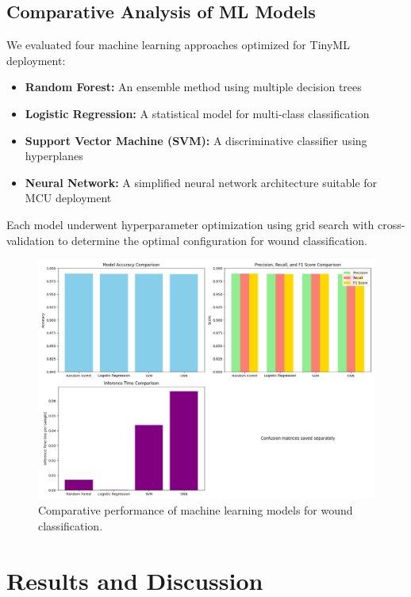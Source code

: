 \documentclass[conference]{IEEEtran}
\begin{document}
\subsection{Comparative Analysis of ML Models}
We evaluated four machine learning approaches optimized for TinyML deployment:

\begin{itemize}
    \item \textbf{Random Forest:} An ensemble method using multiple decision trees
    \item \textbf{Logistic Regression:} A statistical model for multi-class classification
    \item \textbf{Support Vector Machine (SVM):} A discriminative classifier using hyperplanes
    \item \textbf{Neural Network:} A simplified neural network architecture suitable for MCU deployment
\end{itemize}

Each model underwent hyperparameter optimization using grid search with cross-validation to determine the optimal configuration for wound classification.

\begin{figure}[H]
    \centering
    \includegraphics[width=\textwidth]{figures/model_comparison.png}
    \caption{Comparative performance of machine learning models for wound classification.}
    \label{fig:model_comparison}
\end{figure}

\section{Results and Discussion}
\end{document}
